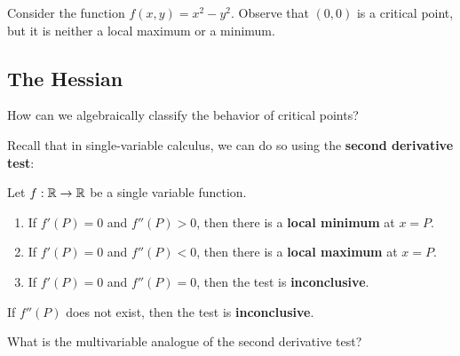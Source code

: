     \begin{example}
        Consider the function $f(x,y) = x^2-y^2$.  Observe that $(0,0)$ is a critical point, but it is neither a local maximum or a minimum.

    \begin{center}
    \end{center}


    \end{example}

\subsection{The Hessian}

\begin{motivating}
    How can we algebraically classify the behavior of critical points?
\end{motivating}

Recall that in single-variable calculus, we can do so using the \textbf{second derivative test}:

\begin{theorem}

Let $f : \mathbb{R} \to \mathbb{R}$ be a single variable function.

\begin{enumerate}
    \item If $f'(P) = 0$ and $f''(P) > 0$, then there is a \textbf{local minimum} at $x=P$. 
    \item If $f'(P) = 0$ and $f''(P) < 0$, then there is a \textbf{local maximum} at $x=P$. 
    \item If $f'(P) = 0$ and $f''(P) = 0$, then the test is \textbf{inconclusive}.
\end{enumerate}

If $f''(P)$ does not exist, then the test is \textbf{inconclusive}.

\end{theorem}

\begin{motivating}
    What is the multivariable analogue of the second derivative test?
\end{motivating}

